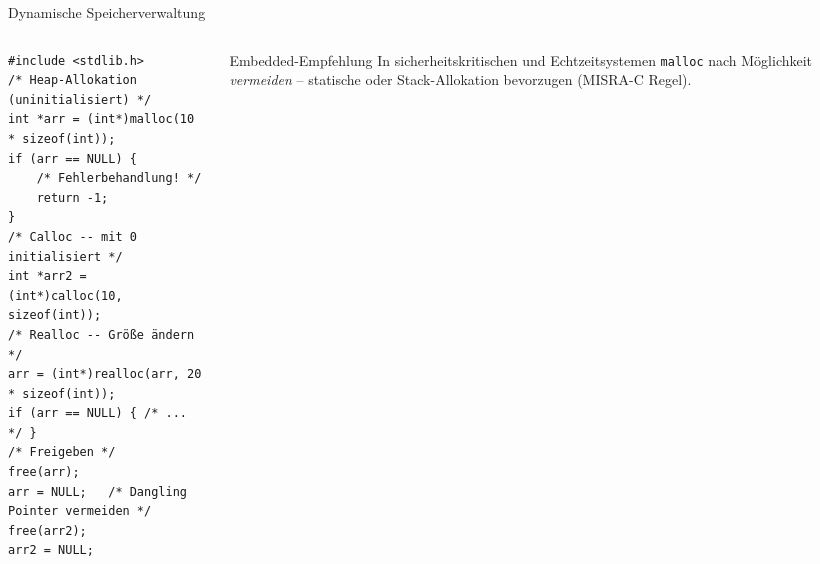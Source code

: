 \documentclass[%
  aspectratio=169,
  10pt
]{beamer}
\begin{document}
\begin{frame}[fragile]{Dynamische Speicherverwaltung}
  \begin{columns}[T]
    \begin{column}{0.52\textwidth}
\begin{lstlisting}
#include <stdlib.h>
/* Heap-Allokation (uninitialisiert) */
int *arr = (int*)malloc(10 * sizeof(int));
if (arr == NULL) {
    /* Fehlerbehandlung! */
    return -1;
}
/* Calloc -- mit 0 initialisiert */
int *arr2 = (int*)calloc(10, sizeof(int));
/* Realloc -- Größe ändern */
arr = (int*)realloc(arr, 20 * sizeof(int));
if (arr == NULL) { /* ... */ }
/* Freigeben */
free(arr);
arr = NULL;   /* Dangling Pointer vermeiden */
free(arr2);
arr2 = NULL;
\end{lstlisting}
    \end{column}
    \begin{column}{0.45\textwidth}
      \begin{alertblock}{Embedded-Empfehlung}
        In sicherheitskritischen und Echtzeitsystemen \texttt{malloc} nach Möglichkeit \emph{vermeiden} -- statische oder
        Stack-Allokation bevorzugen (MISRA-C Regel).
      \end{alertblock}
    \end{column}
  \end{columns}
\end{frame}
\end{document}
